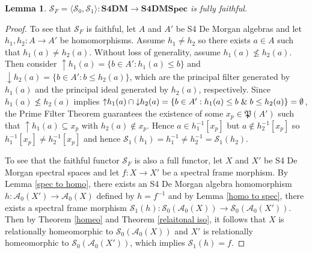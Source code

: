 \documentclass{amsart}
\theoremstyle{plain}
\newtheorem{lemma}[theorem]{Lemma}
\theoremstyle{definition}
\begin{document}
\begin{lemma}\label{fully faithful 1}
    $\mathcal{S}_F=\langle \mathcal{S}_0,\mathcal{S}_1\rangle\colon\mathbf{S4DM}\to\mathbf{S4DMSpec}$ is fully faithful. 
\end{lemma}
\begin{proof}
  To see that $\mathcal{S}_F$ is faithful, let $A$ and $A'$ be S4 De Morgan algebras and let $h_1,h_2\colon A\to A'$ be homomorphisms. Assume $h_1\not= h_2$ so there exists $a\in A$ such that $h_1(a)\not= h_2(a)$. Without loss of generality, assume $h_1(a)\not\leq h_2(a)$. Then consider ${\uparrow}h_1(a)=\{b\in A':h_1(a)\leq b\}$ and ${\downarrow}h_2(a)=\{b\in A':b\leq h_2(a)\}$, which are the principal filter generated by $h_1(a)$ and the principal ideal generated by $h_2(a)$, respectively. Since $h_1(a)\not\leq h_2(a)$ implies ${\uparrow}h_1(a)\cap{\downarrow}h_2(a)=\{b\in A':h_1(a)\leq b\hspace{.1cm}\&\hspace{.1cm}b\leq h_2(a)\}=\emptyset$, the Prime Filter Theorem guarantees the existence of some $x_p\in\mathfrak{P}(A')$ such that ${\uparrow}h_1(a)\subseteq x_p$ with $h_2(a)\not\in x_p$. Hence $a\in h^{-1}_1[x_p]$ but $a\not\in h^{-1}_2[x_p]$ so $h^{-1}_1[x_p]\not=h^{-1}_2[x_p]$ and hence $\mathcal{S}_1(h_1)=h^{-1}_1\not=h^{-1}_2=\mathcal{S}_1(h_2)$.    

    To see that the faithful functor $\mathcal{S}_F$ is also a full functor, let $X$ and $X'$ be S4 De Morgan spectral spaces and let $f\colon X\to X'$ be a spectral frame morphism. By Lemma \ref{spec to homo}, there exists an S4 De Morgan algebra homomorphism $h\colon\mathcal{A}_0(X')\to\mathcal{A}_0(X)$ defined by $h=f^{-1}$ and by Lemma \ref{homo to spec}, there exists a spectral frame morphism $\mathcal{S}_1(h)\colon\mathcal{S}_0(\mathcal{A}_0(X))\to\mathcal{S}_0(\mathcal{A}_0(X'))$. Then by Theorem \ref{homeo} and Theorem \ref{relaitonal iso}, it follows that $X$ is relationally homeomorphic to $\mathcal{S}_0(\mathcal{A}_0(X))$ and $X'$ is relationally homeomorphic to $\mathcal{S}_0(\mathcal{A}_0(X'))$, which implies $\mathcal{S}_1(h)=f$.   
\end{proof}
\end{document}
